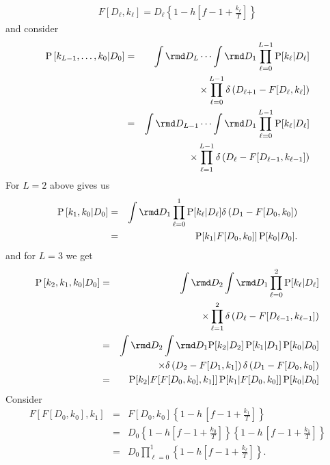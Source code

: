 \documentclass[10pt]{iopart}
\newcommand{\1}{\mathbf{1}}
\newcommand{\Prob}{\mathrm{P}}
\begin{document}
\begin{eqnarray}
%
F[D_{\ell},k_{\ell}]= D_{\ell}\left\{1- h\left[f- 1+\frac{k_{\ell}}{T}\right]\right\}\label{def:F}
%
\end{eqnarray}
%
and consider
%
\begin{eqnarray}
\Prob\left[k_{L-1},\ldots,k_{0}\vert D_{0}\right]
%
&=&\int\rmd D_{L}\cdots\int\rmd D_{1}\prod_{\ell=0}^{L-1}\Prob[k_\ell\vert D_\ell]\nonumber\\
&&\times\prod_{\ell=0}^{L-1}\delta\left(D_{\ell+1}- F[D_{\ell},k_{\ell}]\right)\nonumber\\
%
&=&\int\rmd D_{L-1}\cdots\int\rmd D_{1}\prod_{\ell=0}^{L-1}\Prob[k_\ell\vert D_\ell]\nonumber\\
&&\times\prod_{\ell=1}^{L-1}\delta\left(D_{\ell}- F[D_{\ell-1},k_{\ell-1}]\right)
%
\end{eqnarray}
%
For $L=2$ above gives us 
%
\begin{eqnarray}
\Prob\left[k_{1},k_{0}\vert D_{0}\right]
%
&=&\int\rmd D_{1}\prod_{\ell=0}^{1}\Prob[k_\ell\vert D_\ell]\delta\left(D_{1}- F[D_{0},k_{0}]\right)\nonumber\\
%
&=&\Prob[k_1\vert F[D_{0},k_{0}]]\,\Prob[k_0\vert D_0]. 
%
\end{eqnarray}
%
and for $L=3$ we get 
%
\begin{eqnarray}
\Prob\left[k_{2},k_{1},k_{0}\vert D_{0}\right]
%
&=&\int\rmd D_{2}\int\rmd D_{1}\prod_{\ell=0}^{2}\Prob[k_\ell\vert D_\ell]\nonumber\\
&&\times\prod_{\ell=1}^{2}\delta\left(D_{\ell}- F[D_{\ell-1},k_{\ell-1}]\right)\nonumber\\
%
&=&\int\rmd D_{2}\int\rmd D_{1}\Prob[k_2\vert D_2]\,\Prob[k_1\vert D_1]\,\Prob[k_0\vert D_0]\nonumber\\
&&\times\delta\left(D_{2}- F[D_{1},k_{1}]\right)\delta\left(D_{1} - F[D_{0},k_{0}]\right)\nonumber\\
%
&=&\Prob[k_2\vert F[F[D_{0},k_{0}],k_{1}]]\,\Prob[k_1\vert F[D_{0},k_{0}]]\,\Prob[k_0\vert D_0]
%
\end{eqnarray}
%
Consider 
%
\begin{eqnarray}
%
F[F[D_{0},k_{0}],k_{1}]&=& F[D_{0},k_{0}]\left\{1- h\,\left[f- 1+\frac{k_{1}}{T}\right]\right\}\nonumber\\
%
&=& D_{0}\left\{1- h\left[f- 1+\frac{k_{0}}{T}\right]\right\}\left\{1- h\,\left[f- 1+\frac{k_{1}}{T}\right]\right\}\nonumber\\
%
&=& D_{0}\prod_{\ell=0}^1\left\{1- h\left[f- 1+\frac{k_{\ell}}{T}\right]\right\}.
%
\end{eqnarray}
\end{document}
